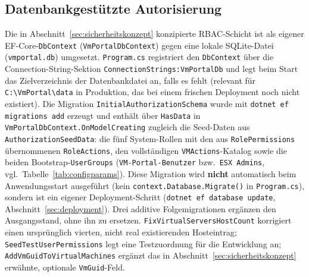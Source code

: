 \documentclass[12pt,a4paper]{article}
\begin{document}
\subsection{Datenbankgestützte Autorisierung}
\label{sec:impl-db-authz}

Die in Abschnitt~\ref{sec:sicherheitskonzept} konzipierte RBAC-Schicht ist als eigener EF-Core-\texttt{DbContext} (\texttt{VmPortalDbContext}) gegen eine lokale SQLite-Datei (\texttt{vmportal.db}) umgesetzt. \texttt{Program.cs} registriert den \texttt{DbContext} über die Connection-String-Sektion \texttt{ConnectionStrings:VmPortalDb} und legt beim Start das Zielverzeichnis der Datenbankdatei an, falls es fehlt (relevant für \texttt{C:\textbackslash VmPortal\textbackslash data} in Produktion, das bei einem frischen Deployment noch nicht existiert). Die Migration \texttt{InitialAuthorizationSchema} wurde mit \texttt{dotnet ef migrations add} erzeugt und enthält über \texttt{HasData} in \texttt{VmPortalDbContext.OnModelCreating} zugleich die Seed-Daten aus \texttt{AuthorizationSeedData}: die fünf System-Rollen mit den aus \texttt{RolePermissions} übernommenen \texttt{RoleActions}, den vollständigen \texttt{VMActions}-Katalog sowie die beiden Bootstrap-\texttt{UserGroups} (\texttt{VM-Portal-Benutzer} bzw.\ \texttt{ESX Admins}, vgl.\ Tabelle~\ref{tab:configparams}). Diese Migration wird \textbf{nicht} automatisch beim Anwendungsstart ausgeführt (kein \texttt{context.Database.Migrate()} in \texttt{Program.cs}), sondern ist ein eigener Deployment-Schritt (\texttt{dotnet ef database update}, Abschnitt~\ref{sec:deployment}). Drei additive Folgemigrationen ergänzen den Ausgangsstand, ohne ihn zu ersetzen. \texttt{FixVirtualServersHostCount} korrigiert einen ursprünglich vierten, nicht real existierenden Hosteintrag; \texttt{SeedTestUserPermissions} legt eine Testzuordnung für die Entwicklung an; \texttt{AddVmGuidToVirtualMachines} ergänzt das in Abschnitt~\ref{sec:sicherheitskonzept} erwähnte, optionale \texttt{VmGuid}-Feld.
\end{document}
